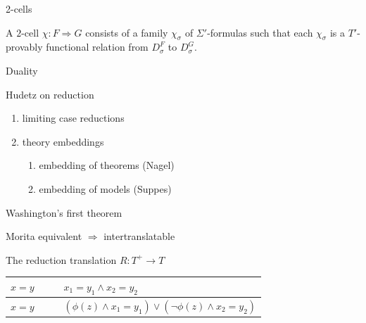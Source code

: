 \documentclass[17pt]{beamer}
\begin{document}
\begin{frame}{\small 2-cells}

  A $2$-cell $\chi :F\Rightarrow G$ consists of a family $\chi
  _\sigma$ of $\Sigma '$-formulas such that each $\chi _\sigma$ is a
  $T'$-provably functional relation from $D^F_\sigma$ to $D^G_\sigma$.


\end{frame}



\begin{frame}[fragile]{\small Duality}


\end{frame}


\begin{frame}{\small Hudetz on reduction}

  \begin{enumerate}
  \item limiting case reductions
  \item theory embeddings
    \begin{enumerate}
    \item embedding of theorems (Nagel)
    \item embedding of models (Suppes)
    \end{enumerate}
  \end{enumerate}


\end{frame}









\begin{frame}{\small Washington's first theorem}

  Morita equivalent $\Longrightarrow$ intertranslatable

  \bigskip
  The reduction translation $R:T^+\to T$

  \vspace{2em}
  
  \begin{tabular}{l l | l l}
    $x=y$ & & & $x_1=y_1\wedge x_2=y_2$ \\ \hline
    $x=y$ & & & $(\phi (z)\wedge x_1=y_1)\vee (\neg \phi (z)\wedge x_2=y_2)$ \end{tabular}


\end{frame}
\end{document}
